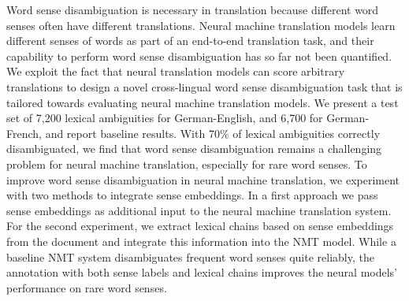 Word sense disambiguation is necessary in translation because different word senses often have different translations. Neural machine translation models learn different senses of words as part of an end-to-end translation task, and their capability to perform word sense disambiguation has so far not been quantified. We exploit the fact that neural translation models can score arbitrary translations to design a novel cross-lingual word sense disambiguation task that is tailored towards evaluating neural machine translation models. We present a test set of 7,200 lexical ambiguities for German-English, and 6,700 for German-French, and report baseline results. With 70\% of lexical ambiguities correctly disambiguated, we find that word sense disambiguation remains a challenging problem for neural machine translation, especially for rare word senses. To improve word sense disambiguation in neural machine translation, we experiment with two methods to integrate sense embeddings. In a first approach we pass sense embeddings as additional input to the neural machine translation system. For the second experiment, we extract lexical chains based on sense embeddings from the document and integrate this information into the NMT model. While a baseline NMT system disambiguates frequent word senses quite reliably, the annotation with both sense labels and lexical chains improves the neural models' performance on rare word senses.
